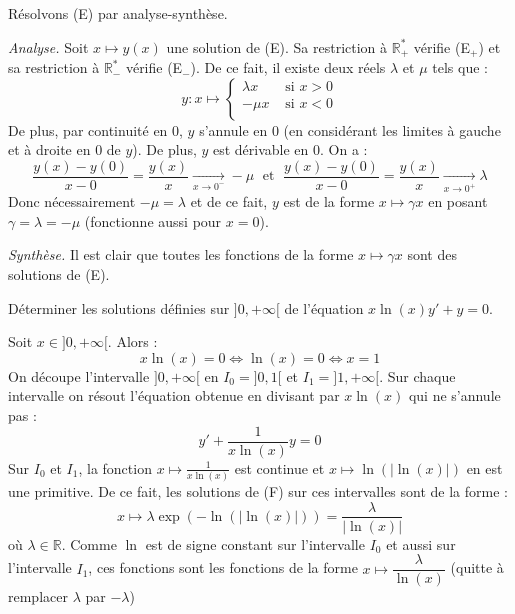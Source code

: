\documentclass[a4paper,10pt]{report}
\begin{document}
\medskip

\noindent Résolvons (E) par analyse-synthèse.

\medskip

\noindent \textit{Analyse.} Soit $x \mapsto y(x)$ une solution de (E). Sa restriction à $\mathbb R_+^*$ vérifie (E$_+$) et sa restriction à $\mathbb R_-^*$ vérifie (E$_-$). De ce fait, il existe deux réels $\lambda$ et $\mu$ tels que :
$$y : x\mapsto \left\{\begin{array}{ll} \lambda x & \text{ si } x > 0 \\-\mu x & \text{ si } x < 0 \\ \end{array}\right.$$
De plus, par continuité en $0$, $y$ s'annule en $0$ (en considérant les limites à gauche et à droite en $0$ de $y$).
De plus, $y$ est dérivable en $0$. On a :
$$\dfrac{y(x)-y(0)}{x-0} = \dfrac{y(x)}{x} \underset{x\to0^-}{\longrightarrow} -\mu \; \text{ et } \; \dfrac{y(x)-y(0)}{x-0} = \dfrac{y(x)}{x} \underset{x\to0^+}{\longrightarrow} \lambda $$
Donc nécessairement $-\mu = \lambda $ et de ce fait, $y$ est de la forme $x \mapsto \gamma x$ en posant $\gamma = \lambda  = -\mu$ (fonctionne aussi pour $x=0$).

\medskip

\noindent \textit{Synthèse.} Il est clair que toutes les fonctions de la forme $x \mapsto \gamma x$ sont des solutions de (E). 

\begin{Exa} Déterminer les solutions définies sur $]0,+\infty[$ de l'équation 
$ x \ln(x)y'+ y = 0$.
\end{Exa}

\corr Soit $x \in ]0,+\infty[$. Alors :
$$x \ln(x) = 0 \iff \ln(x) = 0 \iff x = 1$$
On découpe l'intervalle $]0,+\infty[$ en $I_0 = ]0,1[$ et $I_1 = ]1,+\infty[$. Sur chaque intervalle on résout l'équation obtenue en divisant par $x\ln(x)$ qui ne s'annule pas :
\begin{equation}
\tag{F}
y' + \dfrac{1}{x\ln (x)} y= 0
\end{equation}
Sur $I_0$ et $I_1$, la fonction $x \mapsto \frac{1}{x\ln(x)}$ est continue et $x \mapsto \ln(|\ln (x)|)$ en est une primitive. De ce fait, les solutions de (F) sur ces intervalles sont de la forme :
$$x \mapsto \lambda \exp(-\ln(|\ln (x)|)) = \frac{\lambda}{|\ln (x)|}$$
où $\lambda \in \mathbb{R}$. Comme $\ln$ est de signe constant sur l'intervalle $I_0$ et aussi sur l'intervalle $I_1$, ces fonctions sont les fonctions de la forme $x \mapsto \dfrac{\lambda}{\ln (x)}$ (quitte à remplacer $\lambda$ par $-\lambda$)
\end{document}
